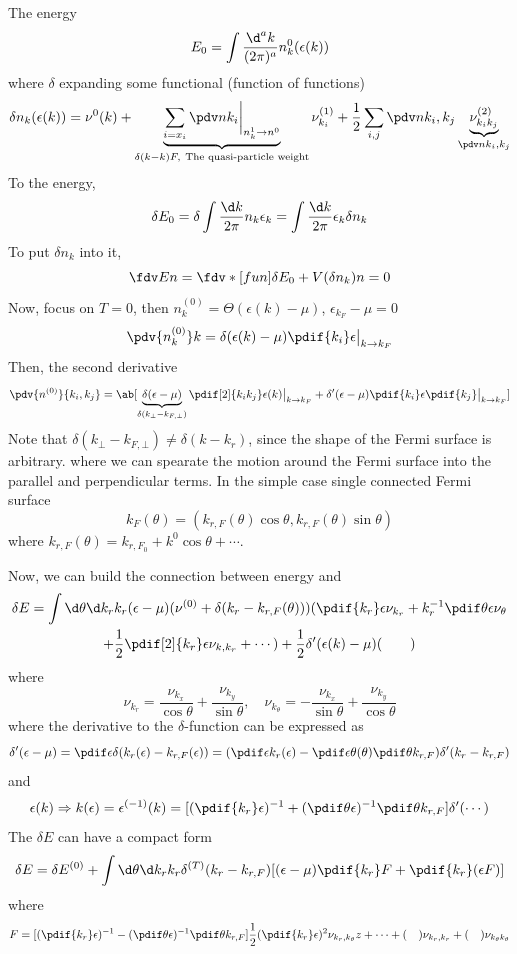 The energy
\[
  E_0 = \int \frac{\d^ak}{(2\pi)^a} n_k^0 (\epsilon(k))
\]
where $\delta$ expanding some functional (function of functions)
\[
  \delta n_k(\epsilon(k)) = \nu^0(k)
+ \underbrace{\sum_{i = x_i} \pdv n{k_i}
  \bigg|_{n_k^1 \to n^0}}_{\delta(k - k)F,\ \text{The quasi-particle weight}}
  \nu_{k_i}^{(1)} + \frac12 \sum_{i,j} \pdv n{k_i,k_j}
  \underbrace{\nu_{k_ik_j}^{(2)}}_{\pdv n{k_i,k_j}}
\]
To the energy,
\[
  \delta E_0 = \delta \int \frac{\d k}{2\pi} n_k \epsilon_k
= \int \frac{\d k}{2\pi} \epsilon_k \delta n_k
\]
To put $\delta n_k$ into it,
\[
  \fdv En = \fdv*[fun]{\delta E_0 + V(\delta n_k)}n = 0
\]
Now, focus on $T = 0$, then $n_k^{(0)} = \Theta (\epsilon(k) - \mu)$,
$\epsilon_{k_F} - \mu = 0$
\[
  \pdv{n_k^{(0)}}k = \delta(\epsilon(k) - \mu)
  \pdif{k_i} \epsilon \big|_{k\to k_F}
\]
Then, the second derivative
\[
  \pdv{n^{(0)}}{k_i,k_j}
= \ab[\underbrace{\delta (\epsilon - \mu)}_{\delta(k_\bot - k_{F,\bot})}
    \pdif[2]{k_ik_j} \epsilon(k)   \big|_{k\to k_F}
    + \delta'(\epsilon - \mu) \pdif{k_i} \epsilon \pdif{k_j} \big|_{k\to k_F}]
\]
Note that $\delta(k_\bot - k_{F,\bot}) \neq \delta(k - k_r)$, since the shape of
the Fermi surface is arbitrary.
where we can spearate the motion around the Fermi surface into the
parallel and perpendicular terms.
In the simple case single connected Fermi surface
\[
  k_F(\theta) = (k_{r,F}(\theta) \cos\theta, k_{r,F}(\theta) \sin\theta)
\]
where $k_{r,F} (\theta) = k_{r,F_0} + k^0\cos\theta + \cdots$.

Now, we can build the connection between energy and
\begin{multline}
  \delta E = \int \d \theta \d k_r k_r(\epsilon - \mu)
  (\nu^{(0)} + \delta(k_r - k_{r,F}(\theta)))
  (\pdif{k_r}\epsilon \nu_{k_r} + k_r^{-1} \pdif\theta\epsilon \nu_\theta\\
  + \frac12 \pdif[2]{k_r} \epsilon \nu_{k,k_r} + \cdots) +
  \frac12\delta'(\epsilon(k) - \mu) (\qquad)
\end{multline}
where
\[
  \nu_{k_r} = \frac{\nu_{k_x}}{\cos\theta} + \frac{\nu_{k_y}}{\sin\theta}, \quad
  \nu_{k_\theta} = -\frac{\nu_{k_x}}{\sin\theta} + \frac{\nu_{k_y}}{\cos\theta}
\]
where the derivative to the $\delta$-function can be expressed as
\[
  \delta'(\epsilon - \mu)
= \pdif\epsilon \delta(k_r(\epsilon) - k_{r,F}(\epsilon))
= (\pdif\epsilon k_r(\epsilon) - \pdif\epsilon \theta(\theta)
  \pdif\theta k_{r,F}) \delta'(k_r - k_{r,F})
\]
and
\[
  \epsilon(k) \Rightarrow k(\epsilon) = \epsilon^{(-1)}(k)
= [(\pdif{k_r}\epsilon)^{-1} + (\pdif\theta\epsilon)^{-1} \pdif\theta k_{r,F}]
  \delta'(\cdots)
\]
The $\delta E$ can have a compact form
\begin{equation}
  \delta E = \delta E^{(0)}
+ \int\d\theta\d k_r k_r \delta^{(T)}(k_r - k_{r,F})
  [(\epsilon - \mu) \pdif{k_r}F + \pdif{k_r}(\epsilon F)]
\end{equation}
where
\[
F =
  [(\pdif{k_r}\epsilon)^{-1} - (\pdif\theta\epsilon)^{-1} \pdif\theta k_{r,F}]
  \frac12 (\pdif{k_r}\epsilon)^2 \nu_{k_r,k_\theta}z + \cdots +
  (\quad)\nu_{k_r,k_r} + (\quad) \nu_{k_\theta k_\theta}
\]

